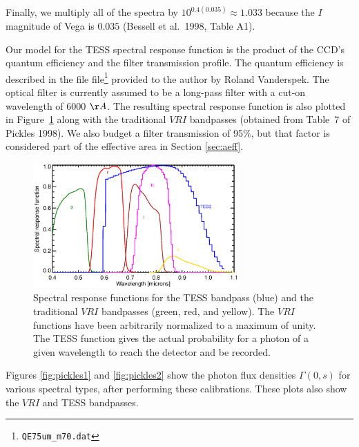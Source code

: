 \documentclass[preprint,10pt]{aastex}
\begin{document}
Finally, we multiply all of the spectra by $10^{0.4(0.035)}\approx
1.033$ because the $I$ magnitude of Vega is $0.035$ (Bessell et al.\
1998, Table A1).

Our model for the TESS spectral response function is the product of the CCD's quantum efficiency and the filter transmission profile. The quantum efficiency is described in the file file\footnote{{\tt QE75um\_m70.dat}} provided to the author by Roland Vanderspek. The optical filter is currently assumed to be a long-pass filter with a cut-on wavelength of 6000 $\AA$. The resulting spectral response function is also plotted in Figure~\ref{fig:bandpass} along with the traditional $VRI$ bandpasses (obtained from Table~7 of Pickles 1998). We also budget a filter transmission of 95$\%$, but that factor is considered part of the effective area in Section \ref{sec:aeff}.
\begin{figure}
\begin{center}
\includegraphics[width=0.7\textwidth]{bandpass.eps}
\end{center}
\caption{Spectral response functions for the TESS bandpass (blue)
and the traditional $VRI$ bandpasses (green, red, and yellow).
The $VRI$ functions have been arbitrarily normalized to
a maximum of unity. The TESS function gives the actual
probability for a photon of a given wavelength to reach the
detector and be recorded.}
\label{fig:bandpass}
\end{figure}
 
Figures \ref{fig:pickles1} and \ref{fig:pickles2} show the photon flux
densities $\Gamma(0,s)$ for various spectral types, after performing
these calibrations. These plots also show the $VRI$ and TESS bandpasses.
\end{document}
